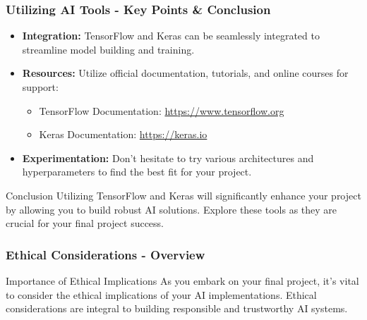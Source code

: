 \documentclass[aspectratio=169]{beamer}
\begin{document}
\begin{frame}[fragile]
    \frametitle{Utilizing AI Tools - Key Points & Conclusion}
    \begin{itemize}
        \item \textbf{Integration:} TensorFlow and Keras can be seamlessly integrated to streamline model building and training.
        \item \textbf{Resources:} Utilize official documentation, tutorials, and online courses for support:
        \begin{itemize}
            \item TensorFlow Documentation: \url{https://www.tensorflow.org}
            \item Keras Documentation: \url{https://keras.io}
        \end{itemize}
        \item \textbf{Experimentation:} Don’t hesitate to try various architectures and hyperparameters to find the best fit for your project.
    \end{itemize}
    \begin{block}{Conclusion}
        Utilizing TensorFlow and Keras will significantly enhance your project by allowing you to build robust AI solutions. Explore these tools as they are crucial for your final project success.
    \end{block}
\end{frame}

\begin{frame}[fragile]
    \frametitle{Ethical Considerations - Overview}
    \begin{block}{Importance of Ethical Implications}
        As you embark on your final project, it's vital to consider the ethical implications of your AI implementations. Ethical considerations are integral to building responsible and trustworthy AI systems.
    \end{block}
\end{frame}
\end{document}
